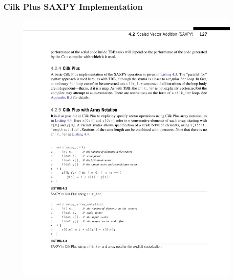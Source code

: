 \documentclass[xcolor=dvipsnames]{beamer}
\begin{document}
		\begin{frame} \frametitle{Cilk Plus SAXPY Implementation}
			\begin{figure}
				\centering
				\includegraphics[width=115mm]{images/listing-4-3.pdf}
			\end{figure}
		\end{frame}
		
\end{document}
